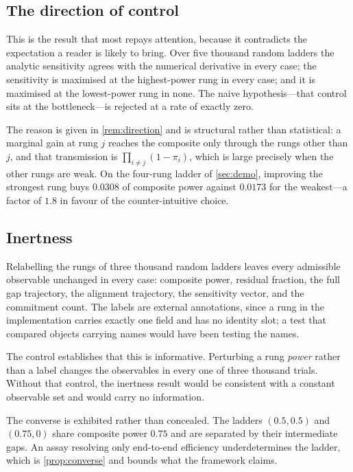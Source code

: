 \documentclass[11pt,twocolumn,a4paper]{article}
\theoremstyle{plain}
\theoremstyle{definition}
\theoremstyle{remark}
\newcommand{\pow}{\pi}
\begin{document}
\subsection{The direction of control}

This is the result that most repays attention, because it contradicts the
expectation a reader is likely to bring. Over five thousand random ladders the
analytic sensitivity agrees with the numerical derivative in every case; the
sensitivity is maximised at the highest-power rung in every case; and it is
maximised at the lowest-power rung in none. The naive hypothesis---that control
sits at the bottleneck---is rejected at a rate of exactly zero.

The reason is given in \cref{rem:direction} and is structural rather than
statistical: a marginal gain at rung $j$ reaches the composite only through the
rungs other than $j$, and that transmission is $\prod_{i \neq j}(1-\pow_i)$,
which is large precisely when the other rungs are weak. On the four-rung ladder
of \cref{sec:demo}, improving the strongest rung buys $0.0308$ of composite
power against $0.0173$ for the weakest---a factor of $1.8$ in favour of the
counter-intuitive choice.

\subsection{Inertness}

Relabelling the rungs of three thousand random ladders leaves every admissible
observable unchanged in every case: composite power, residual fraction, the
full gap trajectory, the alignment trajectory, the sensitivity vector, and the
commitment count. The labels are external annotations, since a rung in the
implementation carries exactly one field and has no identity slot; a test that
compared objects carrying names would have been testing the names.

The control establishes that this is informative. Perturbing a rung
\emph{power} rather than a label changes the observables in every one of three
thousand trials. Without that control, the inertness result would be consistent
with a constant observable set and would carry no information.

The converse is exhibited rather than concealed. The ladders $(0.5, 0.5)$ and
$(0.75, 0)$ share composite power $0.75$ and are separated by their intermediate
gaps. An assay resolving only end-to-end efficiency underdetermines the ladder,
which is \cref{prop:converse} and bounds what the framework claims.
\end{document}
